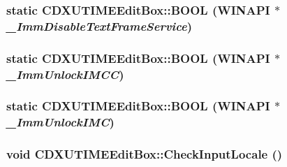 \label{class_c_d_x_u_t_i_m_e_edit_box_ab1828ba67744482b0aec50deb5f9ddaf}
\hypertarget{class_c_d_x_u_t_i_m_e_edit_box_afcf48d94d78c8b2c71af2019c635f0fc}{
\subsubsection[{BOOL}]{\setlength{\rightskip}{0pt plus 5cm}static {\bf CDXUTIMEEditBox::BOOL} (WINAPI $\ast$ {\em \_\-ImmDisableTextFrameService})}}
\label{class_c_d_x_u_t_i_m_e_edit_box_afcf48d94d78c8b2c71af2019c635f0fc}
\hypertarget{class_c_d_x_u_t_i_m_e_edit_box_a371801e557ba4ff1b753b33c1229574f}{
\subsubsection[{BOOL}]{\setlength{\rightskip}{0pt plus 5cm}static {\bf CDXUTIMEEditBox::BOOL} (WINAPI $\ast$ {\em \_\-ImmUnlockIMCC})}}
\label{class_c_d_x_u_t_i_m_e_edit_box_a371801e557ba4ff1b753b33c1229574f}
\hypertarget{class_c_d_x_u_t_i_m_e_edit_box_af5189ef3dc85e23e56fa3938f7d84248}{
\subsubsection[{BOOL}]{\setlength{\rightskip}{0pt plus 5cm}static {\bf CDXUTIMEEditBox::BOOL} (WINAPI $\ast$ {\em \_\-ImmUnlockIMC})}}
\label{class_c_d_x_u_t_i_m_e_edit_box_af5189ef3dc85e23e56fa3938f7d84248}
\hypertarget{class_c_d_x_u_t_i_m_e_edit_box_a77eef5eb2d0b144a985692d8a4cd5d3c}{
\subsubsection[{CheckInputLocale}]{\setlength{\rightskip}{0pt plus 5cm}void CDXUTIMEEditBox::CheckInputLocale ()}}
